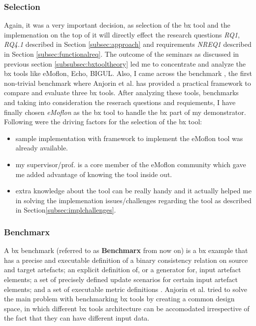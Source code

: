 \subsubsection{Selection}\label{subsubsec:bxtoolselection}
Again, it was a very important decision, as selection of the bx tool and the implemenation on the top of it will directly effect the research questions \textit{RQ1}, \textit{RQ4.1} described in Section \ref{subsec:approach} and requirements \textit{NREQ1} described in Section \ref{subsec:functionalreq}.
\newline\newline The outcome of the seminars as discussed in previous section \ref{subsubsec:bxtooltheory} led me to concentrate and analyze the bx tools like eMoflon, Echo, BIGUL. Also, I came across the benchmark \cite{benchmarx} \cite{benchmarx-reload}, the first non-trivial benchmark where Anjorin et al. has provided a practical framework to compare and evaluate three bx tools. After analyzing these tools, benchmarks and taking into consideration the reserach questions and requiements, I have finally chosen \textit{eMoflon} as the bx tool to handle the bx part of my demonstrator. Following were the driving factors for the selection of the bx tool:
\begin{itemize}
	\item {sample implementation with framework to implement the eMoflon tool was already available.}
	\item {my supervisor/prof. is a core member of the eMoflon community which gave me added advantage of knowing the tool inside out.}
	\item {extra knowledge about the tool can be really handy and it actually helped me in solving the implemenation issues/challenges regarding the tool as described in Section\ref{subsec:implchallenges}.}
\end{itemize}

\subsubsection{Benchmarx}\label{subsubsec:benchmarx}
A bx benchmark (referred to as \textbf{Benchmarx} from now on) is a bx example that has a precise and executable definition of a binary consistency relation on source and target artefacts; an explicit definition of, or a generator for, input artefact elements; a set of precisely defined update scenarios for certain input artefact elements; and a set of executable metric definitions \cite{bx-theoryandappl}.
\newline\newline Anjorin et al. \cite{benchmarx-reload} tried to solve the main problem with benchmarking bx tools by creating a common design space, in which different bx tools architecture can be accomodated irrespective of the fact that they can have different input data. 
